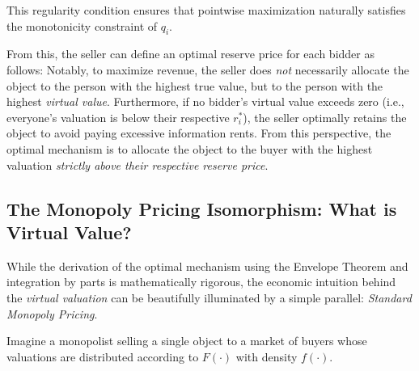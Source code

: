This regularity condition ensures that pointwise maximization naturally satisfies the monotonicity constraint of $q_i$.


From this, the seller can define an optimal reserve price for each bidder as follows:
Notably, to maximize revenue, the seller does \textit{not} necessarily allocate the object to the person with the highest true value, but to the person with the highest \textit{virtual value}. Furthermore, if no bidder's virtual value exceeds zero (i.e., everyone's valuation is below their respective $r_i^*$), the seller optimally retains the object to avoid paying excessive information rents. From this perspective, the optimal mechanism is to allocate the object to the buyer with the highest valuation \textit{strictly above their respective reserve price}.

\subsection{The Monopoly Pricing Isomorphism: What is Virtual Value?}

While the derivation of the optimal mechanism using the Envelope Theorem and integration by parts is mathematically rigorous, the economic intuition behind the \textit{virtual valuation} can be beautifully illuminated by a simple parallel: \textit{Standard Monopoly Pricing}.

Imagine a monopolist selling a single object to a market of buyers whose valuations are distributed according to $F(\cdot)$ with density $f(\cdot)$. 

